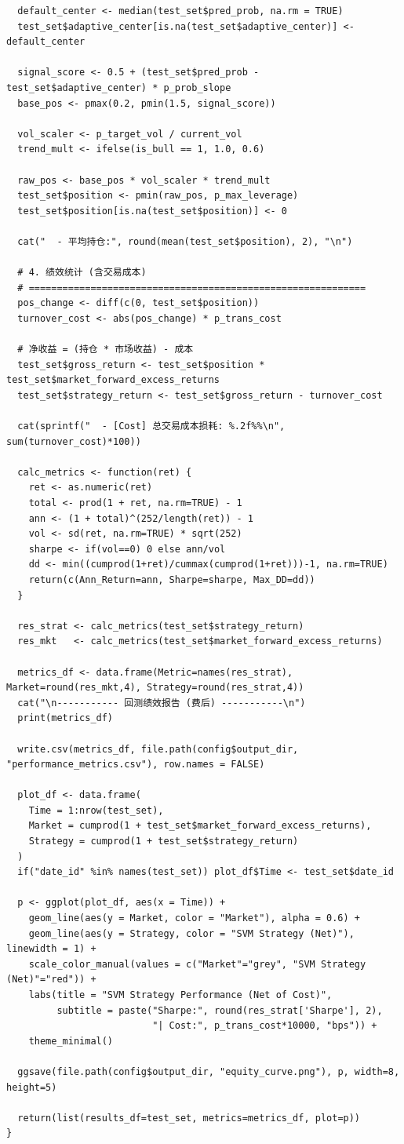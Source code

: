 \documentclass[11pt, a4paper]{article}
\begin{document}
\begin{verbatim}
  default_center <- median(test_set$pred_prob, na.rm = TRUE)
  test_set$adaptive_center[is.na(test_set$adaptive_center)] <- default_center
  
  signal_score <- 0.5 + (test_set$pred_prob - test_set$adaptive_center) * p_prob_slope
  base_pos <- pmax(0.2, pmin(1.5, signal_score))
  
  vol_scaler <- p_target_vol / current_vol
  trend_mult <- ifelse(is_bull == 1, 1.0, 0.6)
  
  raw_pos <- base_pos * vol_scaler * trend_mult
  test_set$position <- pmin(raw_pos, p_max_leverage)
  test_set$position[is.na(test_set$position)] <- 0
  
  cat("  - 平均持仓:", round(mean(test_set$position), 2), "\n")
  
  # 4. 绩效统计 (含交易成本)
  # ============================================================
  pos_change <- diff(c(0, test_set$position))
  turnover_cost <- abs(pos_change) * p_trans_cost
  
  # 净收益 = (持仓 * 市场收益) - 成本
  test_set$gross_return <- test_set$position * test_set$market_forward_excess_returns
  test_set$strategy_return <- test_set$gross_return - turnover_cost
  
  cat(sprintf("  - [Cost] 总交易成本损耗: %.2f%%\n", sum(turnover_cost)*100))
  
  calc_metrics <- function(ret) {
    ret <- as.numeric(ret)
    total <- prod(1 + ret, na.rm=TRUE) - 1
    ann <- (1 + total)^(252/length(ret)) - 1
    vol <- sd(ret, na.rm=TRUE) * sqrt(252)
    sharpe <- if(vol==0) 0 else ann/vol
    dd <- min((cumprod(1+ret)/cummax(cumprod(1+ret)))-1, na.rm=TRUE)
    return(c(Ann_Return=ann, Sharpe=sharpe, Max_DD=dd))
  }
  
  res_strat <- calc_metrics(test_set$strategy_return)
  res_mkt   <- calc_metrics(test_set$market_forward_excess_returns)
  
  metrics_df <- data.frame(Metric=names(res_strat), Market=round(res_mkt,4), Strategy=round(res_strat,4))
  cat("\n----------- 回测绩效报告 (费后) -----------\n")
  print(metrics_df)
  
  write.csv(metrics_df, file.path(config$output_dir, "performance_metrics.csv"), row.names = FALSE)
  
  plot_df <- data.frame(
    Time = 1:nrow(test_set),
    Market = cumprod(1 + test_set$market_forward_excess_returns),
    Strategy = cumprod(1 + test_set$strategy_return)
  )
  if("date_id" %in% names(test_set)) plot_df$Time <- test_set$date_id
  
  p <- ggplot(plot_df, aes(x = Time)) +
    geom_line(aes(y = Market, color = "Market"), alpha = 0.6) +
    geom_line(aes(y = Strategy, color = "SVM Strategy (Net)"), linewidth = 1) +
    scale_color_manual(values = c("Market"="grey", "SVM Strategy (Net)"="red")) +
    labs(title = "SVM Strategy Performance (Net of Cost)",
         subtitle = paste("Sharpe:", round(res_strat['Sharpe'], 2), 
                          "| Cost:", p_trans_cost*10000, "bps")) +
    theme_minimal()
  
  ggsave(file.path(config$output_dir, "equity_curve.png"), p, width=8, height=5)
  
  return(list(results_df=test_set, metrics=metrics_df, plot=p))
}
\end{verbatim}
\end{document}

